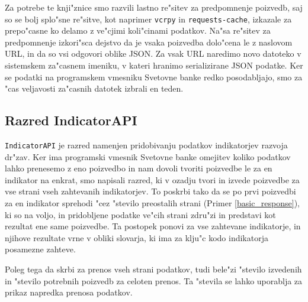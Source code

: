 Za potrebe te knji"znice smo razvili lastno re"sitev za predpomnenje poizvedb,
saj so se bolj splo"sne re"sitve, kot naprimer
\verb|vcrpy| in
\verb|requests-cache|, 
izkazale za prepo"casne ko delamo z ve"cjimi koli"cinami podatkov. Na"sa
re"sitev za predpomnenje izkori"sca dejstvo da je vsaka poizvedba dolo"cena le
z naslovom URL, in da so vsi odgovori oblike JSON. Za vsak URL naredimo novo
datoteko v sistemskem za"casnem imeniku, v kateri hranimo serializirane JSON
podatke. Ker se podatki na programskem vmesniku Svetovne banke redko
posodabljajo, smo za "cas veljavosti za"casnih datotek izbrali en teden.






\subsection{Razred IndicatorAPI}

\verb|IndicatorAPI| je razred namenjen pridobivanju podatkov indikatorjev
razvoja dr"zav. Ker ima programski vmesnik Svetovne banke omejitev koliko 
podatkov lahko prenesemo z eno poizvedbo in nam dovoli tvoriti poizvedbe le za
en indikator na enkrat, smo napisali razred, ki v ozadju tvori in izvede
poizvedbe za vse strani vseh zahtevanih indikatorjev. To poskrbi tako da se po
prvi poizvedbi za en indikator sprehodi "cez "stevilo preostalih strani 
(Primer \ref{basic_response}), ki so na voljo, in pridobljene podatke ve"cih
strani zdru"zi in predstavi kot rezultat ene same poizvedbe. Ta postopek ponovi
za vse zahtevane indikatorje, in njihove rezultate vrne v obliki slovarja, ki 
ima za klju"c kodo indikatorja posamezne zahteve.

Poleg tega da skrbi za prenos vseh strani podatkov, tudi bele"zi "stevilo 
izvedenih in "stevilo potrebnih poizvedb za celoten prenos. Ta "stevila se
lahko uporablja za prikaz napredka prenosa podatkov.



